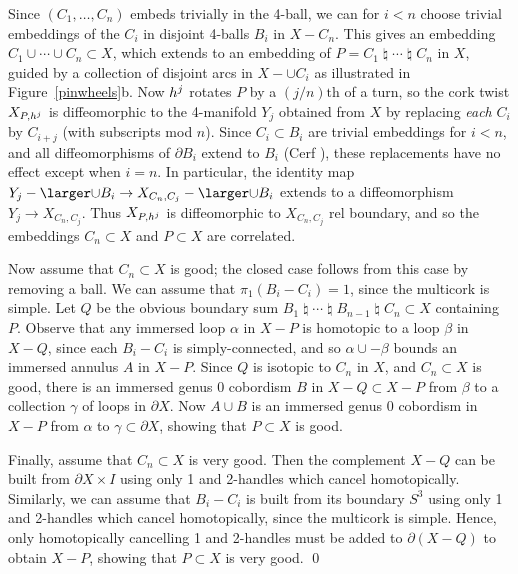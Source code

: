 \documentclass[11pt]{amsart}
\theoremstyle{definition}
\newcommand{\figref}[1]{Figure~\ref{#1}}
\newcommand{\medcup}{\mbox{\larger$\cup$}}
\newcommand{\del}{\partial}
\newcommand{\bcs}{\mathop\natural}
\newcommand{\bsum}{C_1\bcs \cdots \bcs C_{n}}
\newcommand{\foot}[1]{\setcounter{footnote}{1}\footnote{\ #1}}
\begin{document}

\proof  
Since $(C_1,\dots, C_{n})$ embeds trivially in the 4-ball, we can for $i<n$ choose trivial embeddings of the $C_i$ in disjoint 4-balls $B_i$ in $X-C_n$.  This gives an embedding $C_1\cup\cdots\cup C_{n} \subset X$, which extends %
to an embedding of $P=\bsum$ in $X$, guided by a collection of disjoint arcs in $X-\cup C_i$ as illustrated in \figref{pinwheels}b.  Now $h^j$ rotates $P$ by a $(j/n){\text{th}}$ of a turn, so the cork twist $X_{P,h^j}$ is diffeomorphic to the 4-manifold $Y_j$ obtained from $X$ by replacing {\sl each} $C_i$ by $C_{i+j}$ (with subscripts mod $n$).   Since $C_i\subset B_i$ are trivial embeddings for $i<n$, and all diffeomorphisms of $\del B_i$ extend to $B_i$ (Cerf \cite{cerf}), these replacements have no effect except when $i=n$.  In particular, the identity map $Y_j-\medcup B_i \to X_{C_n,C_j}-\medcup B_i$ extends to a diffeomorphism $Y_j \to X_{C_n,C_j}$.  Thus $X_{P,h^j}$ is diffeomorphic to $X_{C_n,C_j}$ rel boundary, and so the embeddings $C_n\subset X$ and $P\subset X$ are correlated.

Now assume that  $C_n\subset X$ is good; the closed case follows from this case by removing a ball.  We can assume that $\pi_1(B_i-C_i) = 1$, since the multicork is simple.  Let $Q$ be the obvious boundary sum $B_1 \bcs \cdots \bcs B_{n-1} \bcs C_n \subset X$ containing $P$.  Observe that any immersed loop $\alpha$ in $X-P$ is homotopic to a loop $\beta$ in $X- Q$, since each $B_i- C_i$ is simply-connected, and so $\alpha \cup -\beta$ bounds an immersed annulus $A$ in $X-P$. Since $Q$ is isotopic to $C_n$ in $X$, and $C_n\subset X$ is good, there is an immersed genus $0$ cobordism $B$ in $X- Q \subset X-P$ from $\beta$ to a collection $\gamma$ of loops in $\del X$. Now $A\cup B$ is an immersed genus $0$ cobordism in $X-P$ from $\alpha$ to $\gamma \subset\del X$, showing that $P\subset X$ is good. 

Finally, assume that  $C_n\subset X$ is very good. Then the complement $X-Q$ can be built from $\partial X \times I$ using only 1 and 2-handles which cancel homotopically. Similarly, we can assume that $B_i-C_i$ is built from its boundary $S^3$ using only 1 and 2-handles which cancel homotopically, since the multicork is simple. Hence, only homotopically cancelling 1 and 2-handles must be added to $\partial (X-Q)$ to obtain $X-P$, showing that $P\subset X$ is very good. 
 \qed
\end{document}
